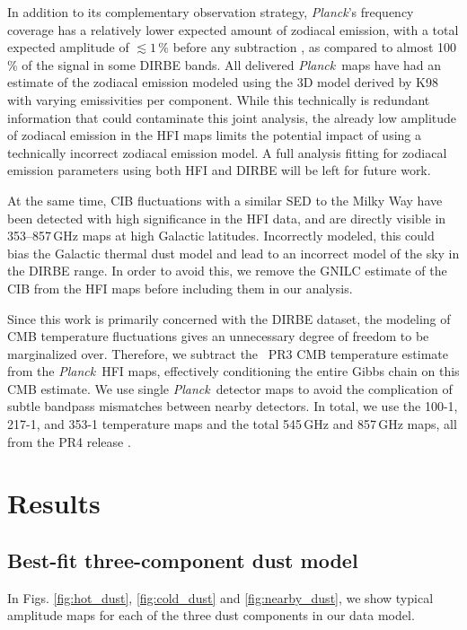 \documentclass{aa}
\def\Planck{\textit{Planck}}
\begin{document}
In addition to its complementary observation strategy, \Planck's frequency coverage has a relatively lower expected amount of zodiacal emission, with a total expected amplitude of $\lesssim1\,\%$ before any subtraction \citep{maris2006c,planck2013-pip88}, as compared to almost 100\,\% of the signal in some DIRBE bands. All delivered \Planck\ maps have had an estimate of the zodiacal emission modeled using the 3D model derived by K98 with varying emissivities per component. While this technically is redundant information that could contaminate this joint analysis, the already low amplitude of zodiacal emission in the HFI maps limits the potential impact of using a technically incorrect zodiacal emission model. A full analysis fitting for zodiacal emission parameters using both HFI and DIRBE will be left for future work.

At the same time, CIB fluctuations with a similar SED to the Milky Way have been detected with high significance in the HFI data, and are directly visible in 353--857\,GHz maps at high Galactic latitudes. Incorrectly modeled, this could bias the Galactic thermal dust model and lead to an incorrect model of the sky in the DIRBE range. In order to avoid this, we remove the GNILC \citep{planck2016-XLVIII} estimate of the CIB from the HFI maps before including them in our analysis.

Since this work is primarily concerned with the DIRBE dataset, the modeling of CMB temperature fluctuations gives an unnecessary degree of freedom to be marginalized over. Therefore, we subtract the \commanderthree\ PR3 CMB temperature estimate from the \Planck\ HFI maps, effectively conditioning the entire Gibbs chain on this CMB estimate.
We use single \Planck\ detector maps to avoid the complication of subtle bandpass mismatches between nearby detectors. In total, we use the 100-1, 217-1, and 353-1 temperature maps and the total 545\,GHz and 857\,GHz maps, all from the PR4 release \citep{npipe}.

\clearpage
\section{Results}

\subsection{Best-fit three-component dust model}
In Figs. \ref{fig:hot_dust}, \ref{fig:cold_dust} and \ref{fig:nearby_dust}, we show typical amplitude maps for each of the three dust components in our data model.
\end{document}
